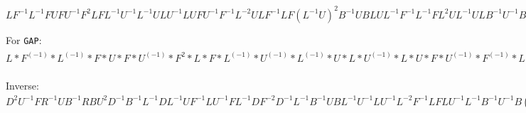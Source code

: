 $LF^{-1}L^{-1}FUFU^{-1}F^2LFL^{-1}U^{-1}L^{-1}ULU^{-1}LUFU^{-1}F^{-1}L^{-2}ULF^{-1}LF(L^{-1}U)^2B^{-1}UBLUL^{-1}F^{-1}L^{-1}FL^2UL^{-1}ULB^{-1}U^{-1}BLDF^2D^{-1}LF^{-1}UL^{-1}FU^{-1}LD^{-1}LBDU^{-2}B^{-1}R^{-1}BU^{-1}RF^{-1}UD^{-2}$

For \texttt{GAP}:
$L*F^(-1)*L^(-1)*F*U*F*U^(-1)*F^2*L*F*L^(-1)*U^(-1)*L^(-1)*U*L*U^(-1)*L*U*F*U^(-1)*F^(-1)*L^(-2)*U*L*F^(-1)*L*F*(L^(-1)*U)^2*B^(-1)*U*B*L*U*L^(-1)*F^(-1)*L^(-1)*F*L^2*U*L^(-1)*U*L*B^(-1)*U^(-1)*B*L*D*F^2*D^(-1)*L*F^(-1)*U*L^(-1)*F*U^(-1)*L*D^(-1)*L*B*D*U^(-2)*B^(-1)*R^(-1)*B*U^(-1)*R*F^(-1)*U*D^(-2)$

Inverse:
$D^2U^{-1}FR^{-1}UB^{-1}RBU^2D^{-1}B^{-1}L^{-1}DL^{-1}UF^{-1}LU^{-1}FL^{-1}DF^{-2}D^{-1}L^{-1}B^{-1}UBL^{-1}U^{-1}LU^{-1}L^{-2}F^{-1}LFLU^{-1}L^{-1}B^{-1}U^{-1}B(U^{-1}L)^2F^{-1}L^{-1}FL^{-1}U^{-1}L^2FUF^{-1}U^{-1}L^{-1}UL^{-1}U^{-1}LULF^{-1}L^{-1}F^{-2}UF^{-1}U^{-1}F^{-1}LFL^{-1}$